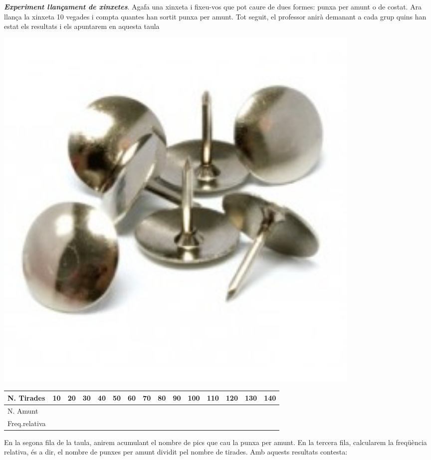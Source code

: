 \begin{mylist}
\pagebreak
 
 \mbox{}
\vspace*{-2.5cm}
\exer \simbolsearch \begin{minipage}[t]{0.7\textwidth}  \textit{\bf Experiment llançament de xinxetes}. Agafa una xinxeta i fixeu-vos que pot caure de dues formes: punxa per amunt o de costat. Ara llança la xinxeta 10 vegades i compta quantes han sortit punxa per amunt. Tot seguit, el professor anirà demanant a cada grup quins han estat els resultats i els apuntarem en aquesta taula
	\end{minipage}
\begin{minipage}{0.3\textwidth}
\vspace{2cm}
\centering
\includegraphics[width=0.8\textwidth]{img-04/xinxetes}
\end{minipage}

\begin{longtable}{|p{0.7in}|p{0.2in}|p{0.2in}|p{0.2in}|p{0.2in}|p{0.2in}|p{0.2in}|p{0.2in}|p{0.2in}|p{0.2in}|p{0.2in}|p{0.2in}|p{0.2in}|p{0.2in}|p{0.2in}|} \hline 
	N. Tirades & 10 & 20 & 30 & 40 & 50 & 60 & 70 & 80 & 90 & 100 & 110 & 120 & 130 & 140 \\ \hline 
	N. Amunt &  &  &  &  &  &  &  &  &  &  &  &  &  &  \\ \hline 
	Freq.\newline relativa &  &  &  &  &  &  &  &  &  &  &  &  &  &  \\ \hline 
\end{longtable}

En la segona fila de la taula, anirem acumulant el nombre de pics que cau la punxa per amunt. En la tercera fila, calcularem la freqüència relativa, és a dir, el nombre de punxes per amunt dividit pel nombre de tirades. Amb aquests resultats contesta:


\end{mylist}
